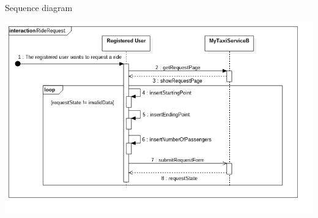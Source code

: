 \documentclass[11pt]{article} %
\begin{document}
\begin{enumerate}
\begin{description}
\begin{enumerate}
			\end{enumerate}
		\end{description}
		\newpage
		Sequence diagram
		\begin{center}
		\includegraphics[scale=0.52]{usecase1.png}
		\end{center}
	

\end{enumerate}
\end{document}
